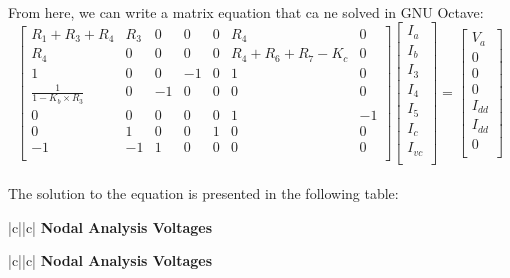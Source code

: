 \paragraph{}
From here, we can write a matrix equation that ca ne solved in GNU Octave:
\[
\begin{bmatrix}
R_1+R_3+R_4 & R_3 & 0 & 0 & 0 & R_4 & 0\\
R_4 & 0 & 0 & 0 & 0 & R_4+R_6+R_7-K_c & 0\\ 
1 & 0 & 0 & -1 & 0 & 1 & 0\\
\frac{1}{1-K_b \times R_3} & 0 & -1 & 0 & 0 & 0 & 0\\
0 & 0 & 0 & 0 & 0 & 1 & -1\\
0 & 1 & 0 & 0 & 1 & 0 & 0\\ 
-1 & -1 & 1 & 0 & 0 & 0 & 0\\ 
\end{bmatrix}
\begin{bmatrix}
I_a\\
I_b\\
I_3\\
I_4\\
I_5\\
I_c\\
I_{vc}\\
\end{bmatrix}
=
\begin{bmatrix}
V_a\\
0\\
0\\
0\\
I_{dd}\\
I_{dd}\\
0\\
\end{bmatrix}
\]

\paragraph{}
The solution to the equation is presented in the following table:

\begin{tabular}{|c||c|}
      \hline    
       {\bf Nodal Analysis Voltages} \\
      \hline

	
     
      \end{tabular}



   \begin{tabular}{|c||c|}
      \hline    
       {\bf Nodal Analysis Voltages} \\
      \hline

        
     
      \end{tabular}
 

